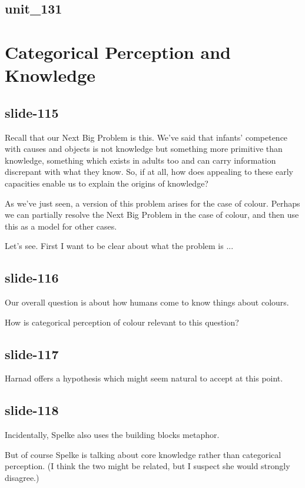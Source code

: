 \documentclass[12pt,\papersize]{extarticle}
\begin{document}
\subsection{unit\_131}
 
 
\section{Categorical Perception and Knowledge}
 
\subsection{slide-115}
Recall that our Next Big Problem is this. 
We've said that infants' competence with causes and objects is not knowledge but something 
more primitive than knowledge, something which exists in adults too and can carry information 
discrepant with what they know. So, if at all, how does appealing to these early capacities 
enable us to explain the origins of knowledge?
 
As we've just seen, a version of this problem arises for the case of colour.
Perhaps we can partially resolve the Next Big Problem in the case of colour, and then use 
this as a model for other cases.
 
Let's see.
First I want to be clear about what the problem is ...
 
\subsection{slide-116}
Our overall question is about how humans come to know things about colours.
 
How is categorical perception of colour relevant to this question?
 
\subsection{slide-117}
Harnad offers a hypothesis which might seem natural to accept at this point.
 
\subsection{slide-118}
Incidentally, Spelke also uses the building blocks metaphor.
 
But of course Spelke is talking about core knowledge rather than categorical perception.  (I think the two might be related, but I suspect she would strongly disagree.)
 
\end{document}
